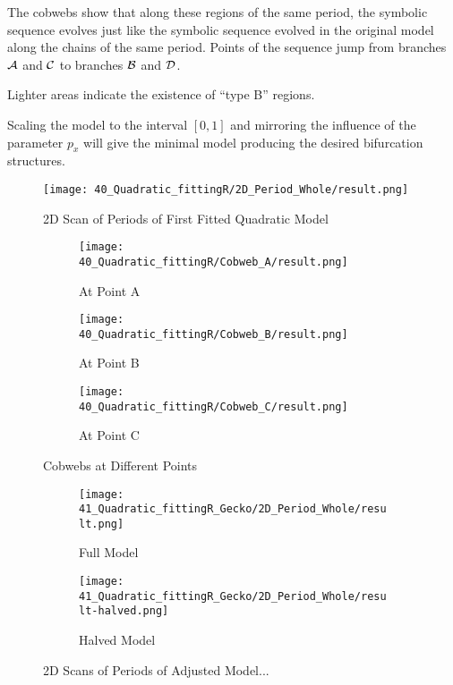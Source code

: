 
The cobwebs show that along these regions of the same period, the symbolic sequence evolves just like the symbolic sequence evolved in the original model along the chains of the same period.
Points of the sequence jump from branches $\mathcal{A}$ and $\mathcal{C}$ to branches $\mathcal{B}$ and $\mathcal{D}$.

Lighter areas indicate the existence of ``type B'' regions.


Scaling the model to the interval $[0, 1]$ and mirroring the influence of the parameter $p_x$ will give the minimal model producing the desired bifurcation structures.


\begin{figure}
	\centering
	\texttt{[image: 40\_Quadratic\_fittingR/2D\_Period\_Whole/result.png]}
	\caption{2D Scan of Periods of First Fitted Quadratic Model}
	\label{fig:quadratic.full.fit.1.Period}
\end{figure}

\begin{figure}
	\centering
	\begin{subfigure}{0.3\textwidth}
		\centering
		\texttt{[image: 40\_Quadratic\_fittingR/Cobweb\_A/result.png]}
		\caption{At Point A}
		\label{fig:quad.full.fit.1.CobwebA}
	\end{subfigure}
	\begin{subfigure}{0.3\textwidth}
		\centering
		\texttt{[image: 40\_Quadratic\_fittingR/Cobweb\_B/result.png]}
		\caption{At Point B}
		\label{fig:quad.full.fit.1.CobwebB}
	\end{subfigure}
	\begin{subfigure}{0.3\textwidth}
		\centering
		\texttt{[image: 40\_Quadratic\_fittingR/Cobweb\_C/result.png]}
		\caption{At Point C}
		\label{fig:quad.full.fit.1.CobwebC}
	\end{subfigure}
	\caption{Cobwebs at Different Points}
	\label{fig:quad.full.fit.1.Cobwebs}
\end{figure}

\begin{figure}
	\centering
	\begin{subfigure}{0.4\textwidth}
		\centering
		\texttt{[image: 41\_Quadratic\_fittingR\_Gecko/2D\_Period\_Whole/result.png]}
		\caption{Full Model}
		\label{fig:quadratic.full.fit.2.period.full}
	\end{subfigure}
	\begin{subfigure}{0.4\textwidth}
		\centering
		\texttt{[image: 41\_Quadratic\_fittingR\_Gecko/2D\_Period\_Whole/result-halved.png]}
		\caption{Halved Model}
		\label{fig:quadratic.full.fit.2.period.halved}
	\end{subfigure}
	\caption{2D Scans of Periods of Adjusted Model...}
\end{figure}

